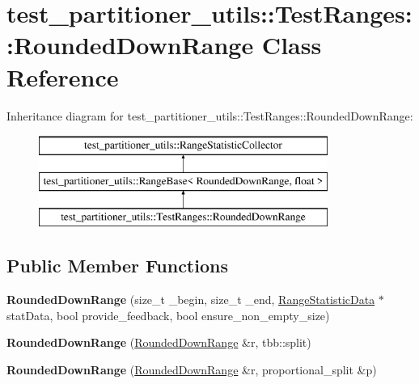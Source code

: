 \hypertarget{classtest__partitioner__utils_1_1TestRanges_1_1RoundedDownRange}{}\section{test\+\_\+partitioner\+\_\+utils\+:\+:Test\+Ranges\+:\+:Rounded\+Down\+Range Class Reference}
\label{classtest__partitioner__utils_1_1TestRanges_1_1RoundedDownRange}
Inheritance diagram for test\+\_\+partitioner\+\_\+utils\+:\+:Test\+Ranges\+:\+:Rounded\+Down\+Range\+:\begin{figure}[H]
\begin{center}
\leavevmode
\includegraphics[height=3.000000cm]{classtest__partitioner__utils_1_1TestRanges_1_1RoundedDownRange}
\end{center}
\end{figure}
\subsection*{Public Member Functions}
\begin{DoxyCompactItemize}
\item 
\hypertarget{classtest__partitioner__utils_1_1TestRanges_1_1RoundedDownRange_a448552aae2185102319dbbfe4747d235}{}{\bfseries Rounded\+Down\+Range} (size\+\_\+t \+\_\+begin, size\+\_\+t \+\_\+end, \hyperlink{structtest__partitioner__utils_1_1RangeStatisticData}{Range\+Statistic\+Data} $\ast$stat\+Data, bool provide\+\_\+feedback, bool ensure\+\_\+non\+\_\+empty\+\_\+size)\label{classtest__partitioner__utils_1_1TestRanges_1_1RoundedDownRange_a448552aae2185102319dbbfe4747d235}

\item 
\hypertarget{classtest__partitioner__utils_1_1TestRanges_1_1RoundedDownRange_a7eda77f770d86126df9d9cb79fe9eb7e}{}{\bfseries Rounded\+Down\+Range} (\hyperlink{classtest__partitioner__utils_1_1TestRanges_1_1RoundedDownRange}{Rounded\+Down\+Range} \&r, tbb\+::split)\label{classtest__partitioner__utils_1_1TestRanges_1_1RoundedDownRange_a7eda77f770d86126df9d9cb79fe9eb7e}

\item 
\hypertarget{classtest__partitioner__utils_1_1TestRanges_1_1RoundedDownRange_adb1ffd7e01e4a9c848bccfc00c944ee5}{}{\bfseries Rounded\+Down\+Range} (\hyperlink{classtest__partitioner__utils_1_1TestRanges_1_1RoundedDownRange}{Rounded\+Down\+Range} \&r, proportional\+\_\+split \&p)\label{classtest__partitioner__utils_1_1TestRanges_1_1RoundedDownRange_adb1ffd7e01e4a9c848bccfc00c944ee5}

\end{DoxyCompactItemize}
